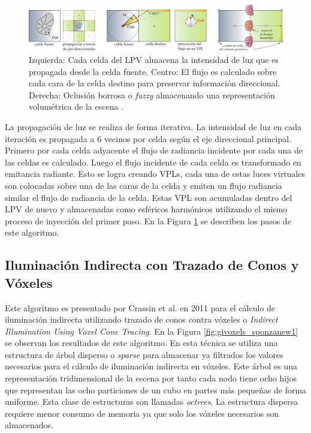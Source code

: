\begin{figure}[H]
	\centering
	\includegraphics[width=\linewidth]{media/lpv_explain.png}
	\caption{Izquierda: Cada celda del \ac{LPV} almacena la intensidad de luz que es propagada desde la celda fuente. Centro: El flujo es calculado sobre cada cara de la celda destino para preservar información direccional. Derecha: Oclusión borrosa o \emph{fuzzy} almacenando una representación volumétrica de la escena \cite{Kaplanyan:2010}.}
	\label{fig:lpv_explain}
\end{figure}

La propagación de luz se realiza de forma iterativa. La intensidad de luz en cada iteración es propagada a 6 vecinos por celda según el eje direccional principal. Primero por cada celda adyacente el flujo de radiancia incidente por cada una de las celdas es calculado. Luego el flujo incidente de cada celda es transformado en emitancia radiante. Esto se logra creando \ac{VPL}s, cada una de estas luces virtuales son colocadas sobre una de las caras de la celda y emiten un flujo radiancia similar el flujo de radiancia de la celda. Estas \ac{VPL} son acumuladas dentro del \ac{LPV} de nuevo y almacenadas como esféricos harmónicos utilizando el mismo proceso de inyección del primer paso. En la Figura \ref{fig:lpv_explain} se describen los pasos de este algoritmo. 

\subsection{Iluminación Indirecta con Trazado de Conos y Vóxeles}
\label{sub:voxel_cone_tracing_orig}
Este algoritmo es presentado por Crassin et al. en 2011 \cite{CNSGE11b} para el cálculo de iluminación indirecta utilizando trazado de conos contra vóxeles o \emph{Indirect Illumination Using Voxel Cone Tracing}. En la Figura \ref{fig:givoxels_sponzanew1} se observan los resultados de este algoritmo. En esta técnica se utiliza una estructura de árbol disperso o \emph{sparse} para almacenar ya filtrados los valores necesarios para el cálculo de iluminación indirecta en vóxeles. Este árbol es una representación tridimensional de la escena por tanto cada nodo tiene ocho hijos que representan las ocho particiones de un cubo en partes más pequeñas de forma uniforme. Esta clase de estructuras son llamadas \emph{octrees}. La estructura dispersa requiere menor consumo de memoria ya que solo los vóxeles necesarios son almacenados.

